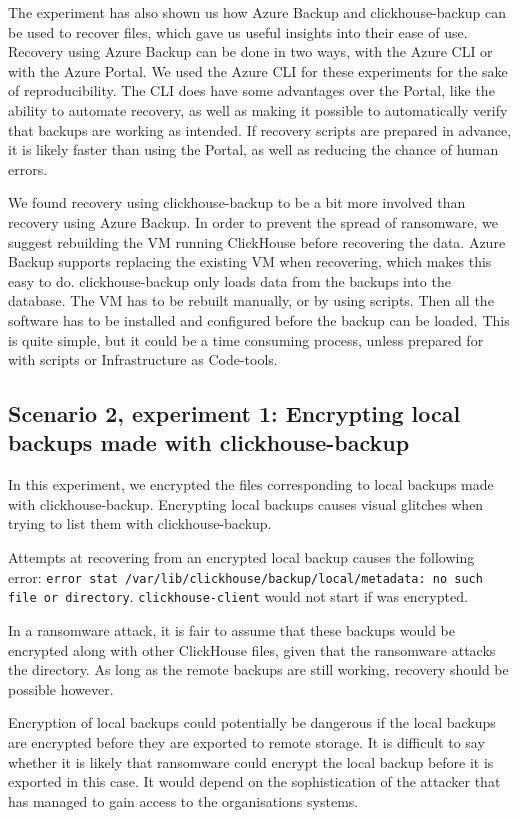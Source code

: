 The experiment has also shown us how Azure Backup and clickhouse-backup can be used to recover files, which gave us useful insights into their ease of use. Recovery using Azure Backup can be done in two ways, with the Azure CLI or with the Azure Portal. We used the Azure CLI for these experiments for the sake of reproducibility.
The CLI does have some advantages over the Portal, like the ability to automate recovery, as well as making it possible to automatically verify that backups are working as intended. If recovery scripts are prepared in advance, it is likely faster than using the Portal, as well as reducing the chance of human errors.

We found recovery using clickhouse-backup to be a bit more involved than recovery using Azure Backup. In order to prevent the spread of ransomware, we suggest rebuilding the VM running ClickHouse before recovering the data. Azure Backup supports replacing the existing VM when recovering, which makes this easy to do. clickhouse-backup only loads data from the backups into the database. The VM has to be rebuilt manually, or by using scripts. Then all the software has to be installed and configured before the backup can be loaded. This is quite simple, but it could be a time consuming process, unless prepared for with scripts or Infrastructure as Code-tools.

\subsection{Scenario 2, experiment 1: Encrypting local backups made with clickhouse-backup}

In this experiment, we encrypted the files corresponding to local backups made with clickhouse-backup. Encrypting local backups causes visual glitches when trying to list them with clickhouse-backup. 

\noindent Attempts at recovering from an encrypted local backup causes the following error: \texttt{error stat /var/lib/clickhouse/backup/local/metadata: no such file or directory}.  \texttt{clickhouse-client} would not start if  was encrypted.

In a ransomware attack, it is fair to assume that these backups would be encrypted along with other ClickHouse files, given that the ransomware attacks the  directory. As long as the remote backups are still working, recovery should be possible however. 

Encryption of local backups could potentially be dangerous if the local backups are encrypted before they are exported to remote storage. It is difficult to say whether it is likely that ransomware could encrypt the local backup before it is exported in this case. It would depend on the sophistication of the attacker that has managed to gain access to the organisations systems. 

